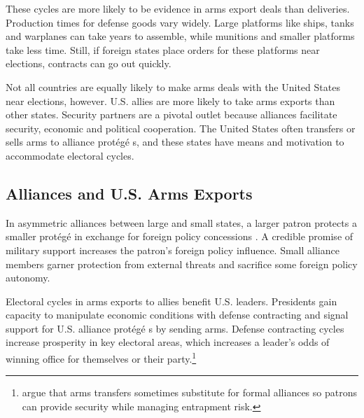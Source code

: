 \documentclass[12pt]{article}
\begin{document}
These cycles are more likely to be evidence in arms export deals than deliveries. 
Production times for defense goods vary widely. 
Large platforms like ships, tanks and warplanes can take years to assemble, while munitions and smaller platforms take less time. 
Still, if foreign states place orders for these platforms near elections, contracts can go out quickly.


Not all countries are equally likely to make arms deals with the United States near elections, however. 
U.S. allies are more likely to take arms exports than other states. 
Security partners are a pivotal outlet because alliances facilitate security, economic and political cooperation.
The United States often transfers or sells arms to alliance prot{\'e}g{\'e} s, and these states have means and motivation to accommodate electoral cycles. 



\subsection{Alliances and U.S. Arms Exports}


In asymmetric alliances between large and small states, a larger patron protects a smaller prot{\'e}g{\'e}  in exchange for foreign policy concessions \citep{Morrow1991}.
A credible promise of military support increases the patron's foreign policy influence. 
Small alliance members garner protection from external threats and sacrifice some foreign policy autonomy.



Electoral cycles in arms exports to allies benefit U.S. leaders.
Presidents gain capacity to manipulate economic conditions with defense contracting and signal support for U.S. alliance prot{\'e}g{\'e} s by sending arms.
Defense contracting cycles increase prosperity in key electoral areas, which increases a leader's odds of winning office for themselves or their party.\footnote{\citet{Yarhi-Miloetal2016} argue that arms transfers sometimes substitute for formal alliances so patrons can provide security while managing entrapment risk.}


\end{document}
